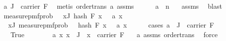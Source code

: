 \begin{isabellebody}
\ \ \ \ \isamarkupfalse%
\ a{\isacharunderscore}{\kern0pt}{}{\isacharcolon}{\kern0pt}\ {\isachardoublequoteopen}J{\isacharprime}{\kern0pt}\ {\isasymsubseteq}\ carrier\ F{\isachardoublequoteclose}\ \isamarkupfalse%
\ {\isacharparenleft}{\kern0pt}metis\ order{\isacharunderscore}{\kern0pt}trans\ a{\isacharunderscore}{\kern0pt}{}\ assms{\isacharparenleft}{\kern0pt}{}{\isacharparenright}{\kern0pt}{\isacharparenright}{\kern0pt}\isanewline
\ \ \ \ \isamarkupfalse%
\ a{\isacharunderscore}{\kern0pt}{}{\isacharcolon}{\kern0pt}\ {\isachardoublequoteopen}{}\ {\isasymle}n\ {\isachardoublequoteclose}\ \isamarkupfalse%
\ assms\ \isamarkupfalse%
\ blast\isanewline
\isanewline
\ \ \ \ \isamarkupfalse%
\ {\isachardoublequoteopen}measure{\isacharunderscore}{\kern0pt}pmf{\isachardot}{\kern0pt}prob\ {\isasymOmega}\ {\isacharbraceleft}{\kern0pt}{\isasymomega}{\isachardot}{\kern0pt}\ {\isasymforall}x{\isasymin}J{\isacharprime}{\kern0pt}{\isachardot}{\kern0pt}\ hash\ F\ x\ {\isasymomega}\ {\isacharequal}{\kern0pt}\ a\ x{\isacharbraceright}{\kern0pt}\ {\isacharequal}{\kern0pt}\isanewline
\ \ \ \ \ \ \ {\isacharparenleft}{\kern0pt}{\isasymProd}x{\isasymin}J{\isacharprime}{\kern0pt}{\isachardot}{\kern0pt}\ measure{\isacharunderscore}{\kern0pt}pmf{\isachardot}{\kern0pt}prob\ {\isasymOmega}\ {\isacharbraceleft}{\kern0pt}{\isasymomega}{\isachardot}{\kern0pt}\ hash\ F\ x\ {\isasymomega}\ {\isacharequal}{\kern0pt}\ a\ x{\isacharbraceright}{\kern0pt}{\isacharparenright}{\kern0pt}{\isachardoublequoteclose}\isanewline
\ \ \ \ \isamarkupfalse%
\ {\isacharparenleft}{\kern0pt}cases\ {\isachardoublequoteopen}a\ {\isacharbackquote}{\kern0pt}\ J{\isacharprime}{\kern0pt}\ {\isasymsubseteq}\ carrier\ F{\isachardoublequoteclose}{\isacharparenright}{\kern0pt}\isanewline
\ \ \ \ \ \ \isamarkupfalse%
\ True\isanewline
\ \ \ \ \ \ \isamarkupfalse%
\ a{\isacharunderscore}{\kern0pt}{}{\isacharcolon}{\kern0pt}\ {\isachardoublequoteopen}{\isasymAnd}x{\isachardot}{\kern0pt}\ x\ {\isasymin}\ J{\isacharprime}{\kern0pt}\ {\isasymLongrightarrow}\ x\ {\isasymin}\ carrier\ F{\isachardoublequoteclose}\ \ \isamarkupfalse%
\ a{\isacharunderscore}{\kern0pt}{}\ assms{\isacharparenleft}{\kern0pt}{}{\isacharparenright}{\kern0pt}\ order{\isacharunderscore}{\kern0pt}trans\ \isamarkupfalse%
\ force\isanewline
\ \ \ \ \ \ \isamarkupfalse%

\end{isabellebody}
